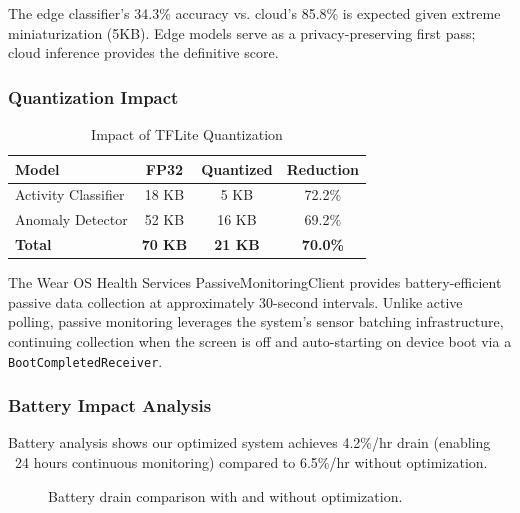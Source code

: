 \documentclass[conference]{IEEEtran}
\begin{document}
The edge classifier's 34.3\% accuracy vs. cloud's 85.8\% is expected given extreme miniaturization (5KB). Edge models serve as a privacy-preserving first pass; cloud inference provides the definitive score.

\subsubsection{Quantization Impact}

\begin{table}[H]
\centering
\caption{Impact of TFLite Quantization}
\label{tab:quantization}
\begin{tabular}{lccc}
\toprule
\textbf{Model} & \textbf{FP32} & \textbf{Quantized} & \textbf{Reduction} \\
\midrule
Activity Classifier & 18 KB & 5 KB & 72.2\% \\
Anomaly Detector & 52 KB & 16 KB & 69.2\% \\
\textbf{Total} & \textbf{70 KB} & \textbf{21 KB} & \textbf{70.0\%} \\
\bottomrule
\end{tabular}
\end{table}

The Wear OS Health Services PassiveMonitoringClient provides battery-efficient passive data collection at approximately 30-second intervals. Unlike active polling, passive monitoring leverages the system's sensor batching infrastructure, continuing collection when the screen is off and auto-starting on device boot via a \texttt{BootCompletedReceiver}.

\subsubsection{Battery Impact Analysis}
Battery analysis shows our optimized system achieves 4.2\%/hr drain (enabling ~24 hours continuous monitoring) compared to 6.5\%/hr without optimization.

\begin{figure}[H]
\centering
{}
\caption{Battery drain comparison with and without optimization.}
\label{fig:battery}
\end{figure}
\end{document}
